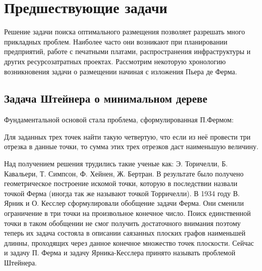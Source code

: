 \section{Предшествующие задачи}

\tab Решение задачи поиска оптимального размещения позволяет разрешать много прикладных проблем. Наиболее часто они возникают при планировании предприятий, работе с печатными платами, распространения инфраструктуры и других ресурсозатратных проектах.
\tab Рассмотрим некоторую хронологию возникновения задачи о размещении начиная с изложения Пьера де Ферма.
\subsection{Задача Штейнера о минимальном дереве}
\tab Фундаментальной основой стала проблема, сформулированная П.Фермом:
\begin{displayquote}
    \begin{center}
        Для заданных трех точек найти такую четвертую, что если из неё провести три отрезка в данные точки, то сумма этих трех отрезков даст наименьшую величину.
    \end{center}
\end{displayquote}
\tab Над получением решения трудились такие ученые как: Э. Торичелли, Б. Кавальери, Т. Симпсон, Ф. Хейнен, Ж. Бертран. В результате было получено геометрическое построение искомой точки, которую в последствии назвали точкой Ферма (иногда так же называют точкой Торричелли). 
\newline
\tab В 1934 году В. Ярник и О. Кесслер сформулировали обобщение задачи Ферма. Они сменили ограничение в три точки на произвольное конечное число. Поиск единственной точки в таком обобщении не смог получить достаточного внимания поэтому теперь их задача состояла в описании саязанных плоских графов наименьшей длинны, проходящих через данное конечное множество точек плоскости.  \cite{courant1941mathematics}
\newline
\tab Сейчас и задачу П. Ферма и задачу Ярника-Кесслера принято называть проблемой Штейнера. 

